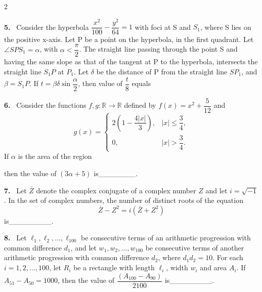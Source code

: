 \documentclass[10pt]{extarticle}
\newcommand{\qn}[1]{\par\smallskip\noindent\textbf{#1.}~}
\begin{document}
\begin{multicols}{2}
\qn{5} Consider the hyperbola $\dfrac{x^2}{100}-\dfrac{y^2}{64}=1$ with foci at S and $S_1$, where S lies on the positive x-axis. Let P be a point on the hyperbola, in the first quadrant. Let $\angle SPS_1=\alpha$, with $\alpha<\dfrac{\pi}{2}$. The straight line passing through the point S and having the same slope as that of the tangent at P to the hyperbola, intersects the straight line $S_1P$ at $P_1$. Let $\delta$ be the distance of P from the straight line $SP_1$, and $\beta=S_1P$. If $t=\beta\delta\sin\dfrac{\alpha}{2}$, then value of $\dfrac{t}{8}$ equals

\qn{6} Consider the functions $f,g:\mathbb{R}\to\mathbb{R}$ defined by $f(x) = x^2+\dfrac{5}{12}$ and
$$g(x) = \begin{cases}2\left(1-\dfrac{4|x|}{3}\right), & |x|\le\dfrac34,\\ 0, & |x|>\dfrac34.\end{cases}$$
If $\alpha$ is the area of the region\par\noindent
{}\par
then the value of $(3\alpha+5)$ is\_\_\_\_\_\_\_.

\qn{7} Let $\bar Z$ denote the complex conjugate of a complex number $Z$ and let $i=\sqrt{-1}$. In the set of complex numbers, the number of distinct roots of the equation
$$\bar Z-Z^2 = i(\bar Z+Z^2)$$
is\_\_\_\_\_\_\_\_.

\qn{8} Let $\ell_1,\ell_2,\ldots,\ell_{100}$ be consecutive terms of an arithmetic progression with common difference $d_1$, and let $w_1,w_2,\ldots,w_{100}$ be consecutive terms of another arithmetic progression with common difference $d_2$, where $d_1d_2=10$. For each $i=1,2,\ldots,100$, let $R_i$ be a rectangle with length $\ell_i$, width $w_i$ and area $A_i$. If $A_{51}-A_{50}=1000$, then the value of $\dfrac{(A_{100}-A_{90})}{2100}$ is\_\_\_\_\_\_\_\_.

\end{multicols}
\end{document}
